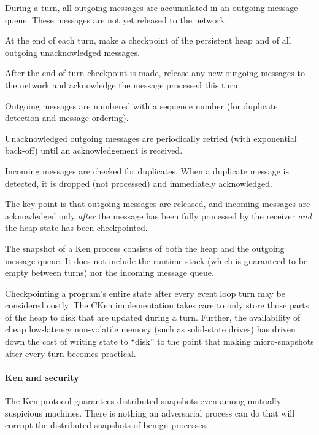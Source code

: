 \documentclass{llncs}
\begin{document}
\begin{itemize*}
  \item During a turn, all outgoing messages are accumulated in an outgoing message queue. These messages are not yet released to the network.
  \item At the end of each turn, make a checkpoint of the persistent heap and of all outgoing unacknowledged messages.
  \item After the end-of-turn checkpoint is made, release any new outgoing messages to the network and acknowledge the message processed this turn.
  \item Outgoing messages are numbered with a sequence number (for duplicate detection and message ordering).
  \item Unacknowledged outgoing messages are periodically retried (with exponential back-off) until an acknowledgement is received.
  \item Incoming messages are checked for duplicates. When a duplicate message is detected, it is dropped (not processed) and immediately acknowledged.
\end{itemize*}

The key point is that outgoing messages are released, and incoming messages are acknowledged only \emph{after} the message has been fully processed by the receiver \emph{and} the heap state has been checkpointed.

The snapshot of a Ken process consists of both the heap and the outgoing message queue. It does not include the runtime stack (which is guaranteed to be empty between turns) nor the incoming message queue.

Checkpointing a program's entire state after every event loop turn may be considered costly. The CKen implementation takes care to only store those parts of the heap to disk that are updated during a turn. Further, the availability of cheap low-latency non-volatile memory (such as solid-state drives) has driven down the cost of writing state to ``disk'' to the point that making micro-snapshots after every turn becomes practical.

\paragraph{Ken and security}

The Ken protocol guarantees distributed snapshots even among mutually suspicious machines. There is nothing an adversarial process can do that will corrupt the distributed snapshots of benign processes.
\end{document}
